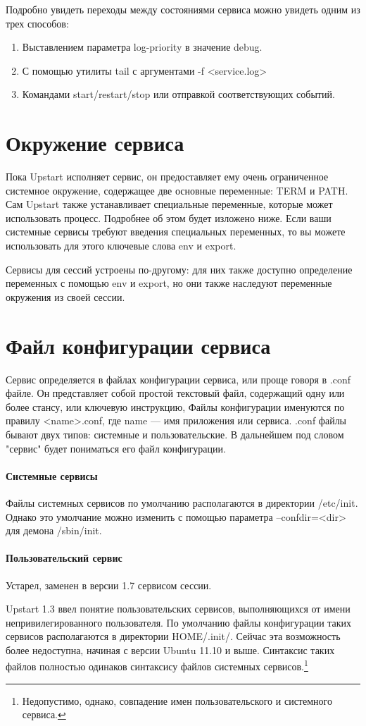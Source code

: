 Подробно увидеть переходы между состояниями сервиса можно увидеть одним из трех способов: \begin{enumerate}
\item Выставлением параметра log-priority в значение debug.
\item С помощью утилиты tail с аргументами -f <service.log>
\item Командами start/restart/stop или отправкой соответствующих событий.
\end{enumerate}
\section{Окружение сервиса}
Пока Upstart исполняет сервис, он предоставляет ему очень ограниченное системное окружение, 
содержащее две основные переменные: TERM и PATH. Сам Upstart также устанавливает специальные переменные, которые может использовать процесс. Подробнее об этом будет изложено ниже. Если ваши системные сервисы 
требуют введения специальных переменных, то вы можете использовать для этого ключевые слова env и export.

Сервисы для сессий устроены по-другому: для них также доступно определение переменных с помощью env и export, но они также наследуют переменные окружения из своей сессии.
\section{Файл конфигурации сервиса}
Сервис определяется в файлах конфигурации сервиса, или проще говоря в .conf файле. Он представляет собой простой текстовый файл, содержащий одну или более стансу, или ключевую инструкцию, Файлы конфигурации именуются по правилу <name>.conf, где  name --- имя приложения или сервиса. .conf файлы бывают двух типов: 
системные и пользовательские. В дальнейшем под словом "сервис" будет пониматься его файл конфигурации.
\paragraph{Системные сервисы}
Файлы системных сервисов по умолчанию располагаются в директории /etc/init. Однако это умолчание можно изменить с помощью параметра --confdir=<dir> для демона /sbin/init. 
\paragraph{Пользовательский сервис}
Устарел, заменен в версии 1.7 сервисом сессии.

Upstart 1.3 ввел понятие пользовательских сервисов, выполняющихся от имени непривилегированного пользователя. По умолчанию файлы конфигурации таких сервисов располагаются в директории \textdollar HOME/.init/. Сейчас эта возможность более недоступна, начиная с версии Ubuntu 11.10 и выше.
Синтаксис таких файлов полностью одинаков синтаксису файлов системных сервисов.\footnote{Недопустимо, однако, совпадение имен пользовательского и системного сервиса.}
